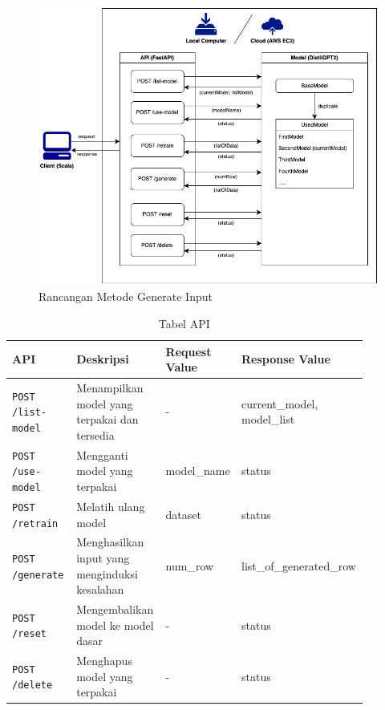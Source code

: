 \begin{figure}[H]
  \centering
  \includegraphics[scale=0.6]{gambar/RancanganMetodeGenerateInput.png}

  \caption{Rancangan Metode Generate Input}
  \label{fig:generateinput}

\end{figure}


\begin{table}[H]
  \centering
  \caption{Tabel API}
  \begin{tabular}{|p{0.18\linewidth}|p{0.25\linewidth}|p{0.17\linewidth}|p{0.28\linewidth}|}
    \hline
    \textbf{API} & \textbf{Deskripsi} & \textbf{Request Value}  & \textbf{Response Value} \\
    \hline
    \raggedright \texttt{POST /list-model} &\raggedright Menampilkan model yang terpakai dan tersedia & - &  current\_model, model\_list \\
    \hline
    \raggedright \texttt{POST /use-model} &\raggedright Mengganti model yang terpakai & model\_name & status \\
    \hline
    \texttt{POST /retrain} &\raggedright Melatih ulang model & dataset & status \\
    \hline
    \raggedright \texttt{POST /generate} &\raggedright Menghasilkan input yang menginduksi kesalahan & num\_row & list\_of\_generated\_row \\
    \hline
    \texttt{POST /reset} &\raggedright Mengembalikan model ke model dasar & - & status \\
    \hline
    \texttt{POST /delete} &\raggedright Menghapus model yang terpakai & - & status \\
    \hline
  \end{tabular}
  \label{tab:api}
\end{table}

